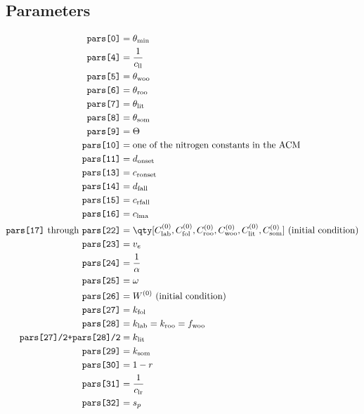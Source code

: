 \documentclass{article}
\begin{document}
		\subsection{Parameters}
			\begin{align*}
				\texttt{pars[0]} &= \theta_\text{min}\\
				\texttt{pars[4]} &= \frac{1}{c_\text{ll}}\\
				\texttt{pars[5]} &= \theta_\text{woo}\\
				\texttt{pars[6]} &= \theta_\text{roo}\\
				\texttt{pars[7]} &= \theta_\text{lit}\\
				\texttt{pars[8]} &= \theta_\text{som}\\
				\texttt{pars[9]} &= \Theta\\
				\texttt{pars[10]} &= \text{one of the nitrogen constants in the ACM}\\
				\texttt{pars[11]} &= d_\text{onset}\\
				\texttt{pars[13]} &= c_\text{ronset}\\
				\texttt{pars[14]} &= d_\text{fall}\\
				\texttt{pars[15]} &= c_\text{rfall}\\
				\texttt{pars[16]} &= c_\text{lma}\\
				\texttt{pars[17]}\text{ through }\texttt{pars[22]} &= \qty[C_\text{lab}^{(0)},C_\text{fol}^{(0)},C_\text{roo}^{(0)},C_\text{woo}^{(0)},C_\text{lit}^{(0)},C_\text{som}^{(0)}]\text{ (initial condition)}\\
				\texttt{pars[23]} &= v_e\\
				\texttt{pars[24]} &= \frac{1}{\alpha}\\
				\texttt{pars[25]} &= \omega\\
				\texttt{pars[26]} &= W^{(0)}\text{ (initial condition)}\\
				\texttt{pars[27]} &= k_\text{fol}\\
				\texttt{pars[28]} &= k_\text{lab} = k_\text{roo} = f_\text{woo}\\
				\texttt{pars[27]/2+pars[28]/2} &= k_\text{lit}\\
				\texttt{pars[29]} &= k_\text{som}\\
				\texttt{pars[30]} &= 1-r\\
				\texttt{pars[31]} &= \frac{1}{c_\text{lr}}\\
				\texttt{pars[32]} &= s_p
			\end{align*}
\end{document}
